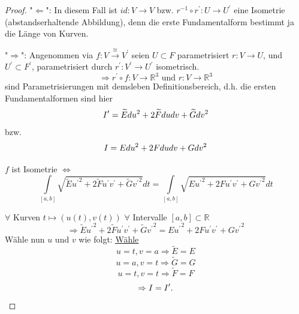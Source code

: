 \documentclass[a4paper,11pt,notitlepage]{report}
\theoremstyle{definition}
\newcommand{\R}{{\ensuremath{\mathbb{R}}}}
\newcommand{\RM}[1]{\MakeUppercase{\romannumeral #1{}}}
\begin{document}
\begin{proof}
	"$\Leftarrow$": In diesem Fall ist $id \colon V \rightarrow V$ bzw. $r^{-1} \circ r^\prime \colon U \rightarrow U^\prime$ eine Isometrie (abstandserhaltende Abbildung), denn die erste Fundamentalform bestimmt ja die Länge von Kurven.
	\newline
	
	"$\Rightarrow$": Angenommen via $f \colon V \overset{\cong}{\rightarrow} V^\prime$ seien $U \subset F$ parametrisiert $r \colon V \rightarrow U$, und $U^\prime \subset F^\prime$, parametrisiert durch $r^\prime \colon V^\prime \rightarrow U^\prime$ isometrisch.
	$$\Rightarrow r^\prime \circ f \colon V \rightarrow \R^3 \text{ und } r \colon V \rightarrow \R^3$$ sind Parametrisierungen mit demsleben Definitionsbereich, d.h. die ersten Fundamentalformen sind hier
	$$\RM{1}^\prime = \widetilde{E} du^2 + 2 \widetilde{F} dudv + \widetilde{G} dv^2$$ bzw.
	$$\RM{1} = E du^2 + 2 F dudv + G dv^2$$
	
	$f$ ist Isometrie $\Leftrightarrow$ 
	$$\int\limits_{[a,b]}{\sqrt{\widetilde{E} {u^\prime}^2 + 2 \widetilde{F}u^\prime v^\prime + \widetilde{G} {v^\prime}^2} dt} = \int\limits_{[a,b]}{\sqrt{E {u^\prime}^2 + 2 F u^\prime v^\prime + G {v^\prime}^2} dt}$$
	
	$\forall$ Kurven $t \mapsto (u(t), v(t))$ \newline
	$\forall$ Intervalle $[a,b] \subset \R$
	$$\Rightarrow \widetilde{E} {u^\prime}^2 + 2 \widetilde{F}u^\prime v^\prime + \widetilde{G} {v^\prime}^2 = E {u^\prime}^2 + 2 F u^\prime v^\prime + G {v^\prime}^2$$
	Wähle nun $u$ und $v$ wie folgt:
	\newline
	\underline{\underline{Wähle}} $$u=t, v=a \Rightarrow \widetilde{E} = E$$
	$$u = a, v= t \Rightarrow \widetilde{G} = G$$
	$$u=t, v=t \Rightarrow \widetilde{F} = F$$
	$$\Rightarrow \RM{1} = \RM{1}^\prime .$$
\end{proof}
\end{document}
